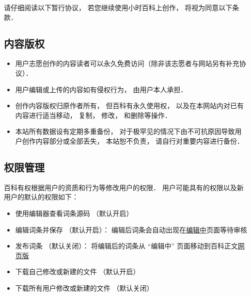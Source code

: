 
请仔细阅读以下暂行协议， 若您继续使用小时百科上创作， 将视为同意以下条款．

\subsection{内容版权}
\begin{itemize}
\item 用户志愿创作的内容读者可以永久免费访问（除非该志愿者与网站另有补充协议）．
\item 用户编辑或上传的内容如有侵权行为， 由用户本人承担．
\item 创作内容版权归原作者所有， 但百科有永久使用权， 以及在本网站内对已有内容进行适当移动， 复制， 修改， 和删除等操作．
\item 本站所有数据设有定期多重备份， 对于极罕见的情况下由不可抗原因导致用户创作内容部分或全部丢失， 本站恕不负责， 请自行对重要内容进行备份．
\end{itemize}

\subsection{权限管理}
百科有权根据用户的资质和行为等修改用户的权限． 用户可能具有的权限以及新用户的默认的权限如下：
\begin{itemize}
\item 使用编辑器查看词条源码 （默认开启）
\item 编辑词条并保存 （默认开启）： 编辑后词条会自动出现在\href{http://wuli.wiki/changed}{编辑中}页面等待审核
\item 发布词条 （默认关闭）： 将编辑后的词条从 “编辑中” 页面移动到百科正文\href{http://wuli.wiki/online}{网页版}
\item 下载自己修改或新建的文件 （默认开启）
\item 下载所有用户修改或新建的文件 （默认关闭）
\end{itemize}
